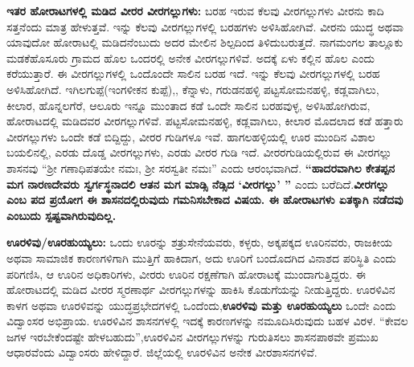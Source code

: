 \textbf{ಇತರ ಹೋರಾಟಗಳಲ್ಲಿ ಮಡಿದ ವೀರರ ವೀರಗಲ್ಲುಗಳು:} ಬರಹ ಇರುವ ಕೆಲವು ವೀರಗಲ್ಲುಗಳು ವೀರನು ಕಾದಿ ಸತ್ತನೆಂದು ಮಾತ್ರ ಹೇಳುತ್ತವೆ. ಇನ್ನು ಕೆಲವು ವೀರಗಲ್ಲುಗಳಲ್ಲಿ ಬರಹಗಳು ಅಳಿಸಿಹೋಗಿವೆ. ವೀರನು ಯುದ್ಧ ಅಥವಾ ಯಾವುದೋ ಹೋರಾಟಲ್ಲಿ ಮಡಿದನೆಂಬುದು ಅದರ ಮೇಲಿನ ಶಿಲ್ಪದಿಂದ ತಿಳಿದುಬರುತ್ತದೆ. ನಾಗಮಂಗಲ ತಾಲ್ಲೂಕು ಮಡಕೆಹೊಸೂರು ಗ್ರಾಮದ ಹೊಲ ಒಂದರಲ್ಲಿ ಅನೇಕ ವೀರಗಲ್ಲುಗಳಿವೆ. ಅದಕ್ಕೆ ಏಳು ಕಲ್ಲಿನ ಹೊಲ ಎಂದು ಕರೆಯುತ್ತಾರೆ. ಈ ವೀರಗಲ್ಲುಗಳಲ್ಲಿ ಒಂದೊಂದೇ ಸಾಲಿನ ಬರಹ ಇದೆ. ಇನ್ನು ಕೆಲವು ವೀರಗಲ್ಲುಗಳಲ್ಲಿ ಬರಹ ಅಳಿಸಿಹೋಗಿದೆ. ಇಗಿಲಗುಪ್ಪೆ(ಇಂಗಳೀಕನ ಕುಪ್ಪೆ),, ಕೆನ್ನಾಳು, ಗರುಡನಹಳ್ಳಿ ಪಟ್ಟಸೋಮನಹಳ್ಳಿ, ಕಡ್ಲವಾಗಿಲು, ಕೀಲಾರ, ಹೊನ್ನಲಗೆರೆ, ಆಲೂರು ಇನ್ನೂ ಮುಂತಾದ ಕಡೆ ಒಂದೇ ಸಾಲಿನ ಬರಹವುಳ್ಳ, ಅಳಿಸಿಹೋಗಿರುವ, ಹೋರಾಟದಲ್ಲಿ ಮಡಿದವರ ವೀರಗಲ್ಲುಗಳಿವೆ. ಪಟ್ಟಸೋಮನಹಳ್ಳಿ, ಕಡ್ಲವಾಗಿಲು, ಕೀಲಾರ ಮೊದಲಾದ ಕಡೆ ಹತ್ತಾರು ವೀರಗಲ್ಲುಗಳು ಒಂದೇ ಕಡೆ ಬಿದ್ದಿದ್ದು, ವೀರರ ಗುಡಿಗಳೂ ಇವೆ. ಹಾಗಲಹಳ್ಳಿಯಲ್ಲಿ ಊರ ಮುಂದಿನ ವಿಶಾಲ ಬಯಲಿನಲ್ಲಿ, ಎರಡು ದೊಡ್ಡ ವೀರಗಲ್ಲುಗಳು, ಎರಡು ವೀರರ ಗುಡಿ ಇದೆ. ವೀರರಗುಡಿಯಲ್ಲಿರುವ ಈ ವೀರಗಲ್ಲು ಶಾಸನವು “ಶ‍್ರೀ ಗಣಾಧಿಪತಯೇ ನಮಃ, ಶ‍್ರೀ ಸರಸ್ವತೀ ನಮಃ” ಎಂದು ಆರಂಭವಾಗಿದೆ. \textbf{“ಹಾದರವಾಗಿಲ ಕೇತಪ್ಪನ ಮಗ ನಾರಣದೇವರು ಸ್ವರ್ಗಸ್ಥನಾದಲಿ ಆತನ ಮಗ ಮಾಡ್ಸಿ ನೆಡ್ಸಿದ ‘ವೀರಗಲ್ಲು’ ”} ಎಂದು ಬರೆದಿದೆ.\textbf{ವೀರಗಲ್ಲು ಎಂಬ ಪದ ಪ್ರಯೋಗ ಈ ಶಾಸನದಲ್ಲಿರುವುದು ಗಮನಿಸಬೇಕಾದ ವಿಷಯ. ಈ ಹೋರಾಟಗಳು ಏತಕ್ಕಾಗಿ ನಡೆದವು ಎಂಬುದು ಸ್ಪಷ್ಟವಾಗಿರುವುದಿಲ್ಲ.}

\textbf{ಊರಳಿವು/ಊರಹುಯ್ಯಲು:} ಒಂದು ಊರನ್ನು ಶತ್ರುಸೇನೆಯವರು, ಕಳ್ಳರು, ಅಕ್ಕಪಕ್ಕದ ಊರಿನವರು, ರಾಜಕೀಯ ಅಥವಾ ಸಾಮಾಜಿಕ ಕಾರಣಗಳಿಗಾಗಿ ಮುತ್ತಿಗೆ ಹಾಕಿದಾಗ, ಅದು ಊರಿಗೆ ಬಂದೊದಗಿದ ವಿನಾಶದ ಪರಿಸ್ಥಿತಿ ಎಂದು ಪರಿಗಣಿಸಿ, ಆ ಊರಿನ ಅಧಿಕಾರಿಗಳು, ವೀರರು ಊರಿನ ರಕ್ಷಣೆಗಾಗಿ ಹೋರಾಟಕ್ಕೆ ಮುಂದಾಗುತ್ತಿದ್ದರು. ಈ ಹೋರಾಟದಲ್ಲಿ ಮಡಿದ ವೀರರ ಸ್ಮರಣಾರ್ಥ ವೀರಗಲ್ಲುಗಳನ್ನು ಹಾಕಿಸಿ ಕೊಡುಗೆಯನ್ನು ನೀಡುತ್ತಿದ್ದರು. ಊರಳಿವಿನ ಕಾಳಗ ಅಥವಾ ಊರಳಿವನ್ನು ಯುದ್ಧಪ್ರಭೇದಗಳಲ್ಲಿ ಒಂದೆಂದು,\textbf{ಊರಳಿವು ಮತ್ತು ಊರಹುಯ್ಯಲು} ಒಂದೇ ಎಂದು ವಿದ್ವಾಂಸರ ಅಭಿಪ್ರಾಯ. ಊರಳಿವಿನ ಶಾಸನಗಳಲ್ಲಿ ಇದಕ್ಕೆ ಕಾರಣಗಳನ್ನು ನಮೂದಿಸಿರುವುದು ಬಹಳ ವಿರಳ. “ಕೇವಲ ಜಗಳ ಇರಬೇಕೆಂದಷ್ಟೇ ಹೇಳಬಹುದು”,ಊರಳಿವಿನ ವೀರಗಲ್ಲುಗಳನ್ನು ಗುರುತಿಸಲು ಶಾಸನಪಾಠವೇ ಪ್ರಮುಖ ಆಧಾರವೆಂದು ವಿದ್ವಾಂಸರು ಹೇಳಿದ್ದಾರೆ. ಜಿಲ್ಲೆಯಲ್ಲಿ ಊರಳಿವಿನ ಅನೇಕ ವೀರಶಾಸನಗಳಿವೆ.

